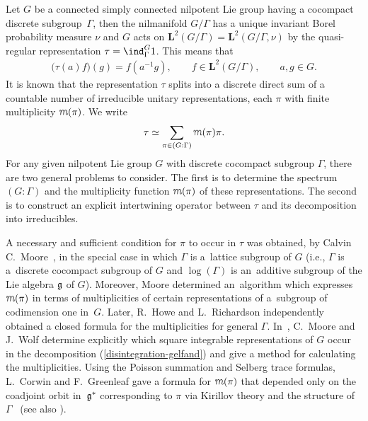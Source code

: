 \documentclass[pdftex]{sigma}
\def\mult{\mbox{\usefont{T1}{cmfr}{m}{it}
  \selectfont m}}
\begin{document}
Let $G$ be a  connected simply connected nilpotent Lie group having
a cocompact discrete subgroup~$\Gamma$, then the nilmanifold
$G/\Gamma$ has a unique invariant Borel probability measure $\nu$
and $G$ acts on $\mathbf{L}^2(G/\Gamma) = \mathbf{L}^2(G/\Gamma,
\nu)$ by the quasi-regular representation $\tau = \ind_\Gamma^G 1 $.
This means that
\begin{gather*}%
\big(\tau(a) f\big)(g) = f(a^{-1} g),\qquad  f\in
\mathbf{L}^2(G/\Gamma),\qquad a, g \in G.
\end{gather*}
It is known \cite[p.~23]{Gelfand1} that the representation $\tau$
splits into a discrete direct sum of a countable number of
irreducible unitary representations, each $ \pi $ with f\/inite
multiplicity $\mult(\pi)  $. We write
\begin{gather}\label{disintegration-gelfand}
\tau \simeq   \sum _{\pi \in (G:\Gamma)} \mult(\pi)
 \pi.
\end{gather}
For any given nilpotent Lie group $G$ with discrete cocompact
subgroup $\Gamma$, there are two general problems to consider. The
f\/irst is to determine the spectrum $(G:\Gamma)$ and the multiplicity
function $\mult(\pi)$ of these representations. The second is to
construct an explicit  intertwining operator
  between $\tau$ and its decomposition into irreducibles.

  A necessary and suf\/f\/icient condition for
$\pi$ to occur in $\tau$ was obtained, by Calvin C.~Moore~\cite{Moore1}, in the special case in which $\Gamma$ is a~lattice
subgroup of $G$ (i.e., $\Gamma$ is a~discrete cocompact subgroup of
$G$ and $\log(\Gamma)$ is an~additive subgroup of the Lie algebra
$\frak g$ of $G$). Moreover, Moore determined an~algorithm which
expresses $\mult(\pi)$ in terms of multiplicities of certain
representations of a~subgroup of codimension one in~$G$. Later, R.~Howe and L.~Richardson \cite{Howe2,Richardson1}
independently obtained a closed formula for the multiplicities for
general $\Gamma$. In~\cite{Moore2}, C.~Moore and J.~Wolf determine
explicitly  which square integrable representations of $G$ occur in
the decomposition (\ref{disintegration-gelfand}) and give a method
for calculating the multiplicities. Using the Poisson summation and
Selberg trace formulas,  L.~Corwin and F.~Greenleaf gave a formula
for $\mult(\pi)$ that depended only on the coadjoint orbit in~$\frak
g^*$ corresponding to $\pi$ via Kirillov theory and the structure of
$\Gamma$~\cite{Cor9} (see also \cite{Cor4,Cor5, Cor7,Cor9,Cor10}).
\end{document}
